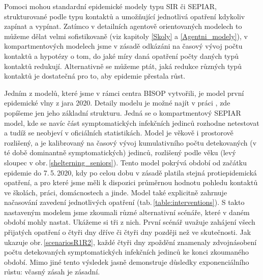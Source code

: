 Pomoci mohou standardní epidemické modely typu SIR či SEPIAR, strukturované podle typu kontaktů a umožňující jednotlivá opatření kdykoliv zapínat a vypínat. Zatímco v detailních agentově orientovaných modelech to můžeme dělat velmi sofistikovaně (viz kapitoly \ref{Skoly} a \ref{Agentni_modely}), v kompartmentových modelech jsme v zásadě odkázáni na časový vývoj počtu kontaktů a hypotézy o tom, do jaké míry daná opatření počty daných typů kontaktů redukují. Alternativně se můžeme ptát, jaká redukce různých typů kontaktů je dostatečná pro to, aby epidemie přestala růst.   

Jedním z modelů, které jsme v rámci centra BISOP vytvořili, je model první epidemické vlny z jara 2020. Detaily modelu je možné najít v práci \cite{Berec_modelB}, zde popíšeme jen jeho základní strukturu. Jedná se o kompartmentový SEPIAR model, kde se navíc část symptomatických infekčních jedinců rozhodne netestovat a tudíž se neobjeví v oficiálních statistikách. Model je věkově i prostorově rozlišený, a je kalibrovaný na časový vývoj kumulativního počtu detekovaných (v té době dominantně symptomatických) jedinců, rozlišený podle věku (levý sloupec v obr.\,\ref{shelterning_seniors}). Tento model pokrývá období od začátku epidemie do 7.\,5.\,2020, kdy po celou dobu v zásadě platila stejná protiepidemická opatření, a pro které jsme měli k dispozici průměrnou hodnotu pohledu kontaktů ve školách, práci, domácnostech a jinde. Model také explicitně zahrnuje načasování zavedení jednotlivých opatření (tab.\,\ref{table:interventions}). S takto nastaveným modelem jsme zkoumali různé alternativní scénáře, které v daném období mohly nastat. Ukážeme si tři z nich. První scénář uvažuje zahájení všech přijatých opatření o čtyři dny dříve či čtyři dny později než ve skutečnosti. Jak ukazuje obr.\,\ref{scenariosR1R2}, každé čtyři dny zpoždění znamenaly zdvojnásobení počtu detekovaných symptomatických infekčních jedinců ke konci zkoumaného období. Mimo jiné tento výsledek jasně demonstruje důsledky exponenciálního růstu: včasný zásah je zásadní. 

